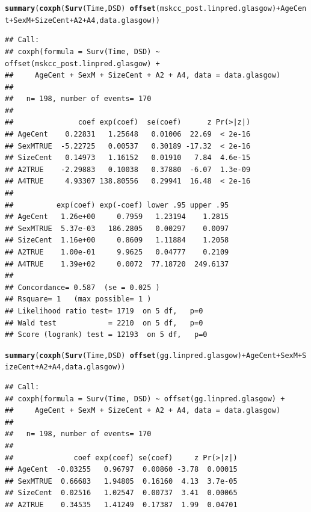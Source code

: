 \documentclass{article}\usepackage[]{graphicx}\usepackage[]{color}
\makeatletter
\newcommand{\hlopt}[1]{\textcolor[rgb]{0,0,0}{#1}}%
\newcommand{\hlstd}[1]{\textcolor[rgb]{0.345,0.345,0.345}{#1}}%
\newcommand{\hlkwd}[1]{\textcolor[rgb]{0.737,0.353,0.396}{\textbf{#1}}}%
\newenvironment{kframe}{%
 \def\at@end@of@kframe{}%
 \ifinner\ifhmode%
  \def\at@end@of@kframe{\end{minipage}}%
  \begin{minipage}{\columnwidth}%
 \fi\fi%
 \def\FrameCommand##1{\hskip\@totalleftmargin \hskip-\fboxsep
 \colorbox{shadecolor}{##1}\hskip-\fboxsep
     \hskip-\linewidth \hskip-\@totalleftmargin \hskip\columnwidth}%
 \MakeFramed {\advance\hsize-\width
   \@totalleftmargin\z@ \linewidth\hsize
   \@setminipage}}%
 {\par\unskip\endMakeFramed%
 \at@end@of@kframe}
\newenvironment{knitrout}{}{} %
\makeatother
\begin{document}
\begin{knitrout}
\begin{kframe}
{\ttfamily\noindent\bfseries\color{errorcolor}{\#\# Error in fitter(X, Y, strats, offset, init, control, weights = weights, : NA/NaN/Inf in foreign function call (arg 6)}}\begin{alltt}
\hlkwd{summary}\hlstd{(}\hlkwd{coxph}\hlstd{(}\hlkwd{Surv}\hlstd{(Time, DSD)} \hlopt{~} \hlkwd{offset}\hlstd{(mskcc_post.linpred.glasgow)} \hlopt{+} \hlstd{AgeCent} \hlopt{+} \hlstd{SexM} \hlopt{+} \hlstd{SizeCent} \hlopt{+} \hlstd{A2} \hlopt{+} \hlstd{A4, data.glasgow))}
\end{alltt}
\begin{verbatim}
## Call:
## coxph(formula = Surv(Time, DSD) ~ offset(mskcc_post.linpred.glasgow) + 
##     AgeCent + SexM + SizeCent + A2 + A4, data = data.glasgow)
## 
##   n= 198, number of events= 170 
## 
##               coef exp(coef)  se(coef)      z Pr(>|z|)
## AgeCent    0.22831   1.25648   0.01006  22.69  < 2e-16
## SexMTRUE  -5.22725   0.00537   0.30189 -17.32  < 2e-16
## SizeCent   0.14973   1.16152   0.01910   7.84  4.6e-15
## A2TRUE    -2.29883   0.10038   0.37880  -6.07  1.3e-09
## A4TRUE     4.93307 138.80556   0.29941  16.48  < 2e-16
## 
##          exp(coef) exp(-coef) lower .95 upper .95
## AgeCent   1.26e+00     0.7959   1.23194    1.2815
## SexMTRUE  5.37e-03   186.2805   0.00297    0.0097
## SizeCent  1.16e+00     0.8609   1.11884    1.2058
## A2TRUE    1.00e-01     9.9625   0.04777    0.2109
## A4TRUE    1.39e+02     0.0072  77.18720  249.6137
## 
## Concordance= 0.587  (se = 0.025 )
## Rsquare= 1   (max possible= 1 )
## Likelihood ratio test= 1719  on 5 df,   p=0
## Wald test            = 2210  on 5 df,   p=0
## Score (logrank) test = 12193  on 5 df,   p=0
\end{verbatim}
\begin{alltt}
\hlkwd{summary}\hlstd{(}\hlkwd{coxph}\hlstd{(}\hlkwd{Surv}\hlstd{(Time, DSD)} \hlopt{~} \hlkwd{offset}\hlstd{(gg.linpred.glasgow)} \hlopt{+} \hlstd{AgeCent} \hlopt{+} \hlstd{SexM} \hlopt{+} \hlstd{SizeCent} \hlopt{+} \hlstd{A2} \hlopt{+} \hlstd{A4, data.glasgow))}
\end{alltt}
\begin{verbatim}
## Call:
## coxph(formula = Surv(Time, DSD) ~ offset(gg.linpred.glasgow) + 
##     AgeCent + SexM + SizeCent + A2 + A4, data = data.glasgow)
## 
##   n= 198, number of events= 170 
## 
##              coef exp(coef) se(coef)     z Pr(>|z|)
## AgeCent  -0.03255   0.96797  0.00860 -3.78  0.00015
## SexMTRUE  0.66683   1.94805  0.16160  4.13  3.7e-05
## SizeCent  0.02516   1.02547  0.00737  3.41  0.00065
## A2TRUE    0.34535   1.41249  0.17387  1.99  0.04701

\end{verbatim}
\end{kframe}
\end{knitrout}
\end{document}
